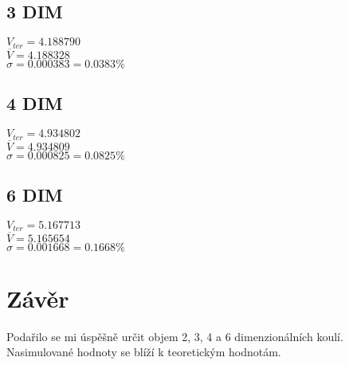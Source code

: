 \documentclass{article}
\begin{document}
\subsection{3 DIM}
$V_{ter} = 4.188790$\\
$\overline{V} = 4.188328$\\
$\sigma = 0.000383 = 0.0383 \%$
\subsection{4 DIM}
$V_{ter} = 4.934802$\\
$\overline{V} = 4.934809$\\
$\sigma = 0.000825 = 0.0825 \%$
\subsection{6 DIM}
$V_{ter} = 5.167713$\\
$\overline{V} = 5.165654$\\
$\sigma = 0.001668 = 0.1668 \%$
\newpage
\section{Závěr}
Podařilo se mi úspěšně určit objem 2, 3, 4 a 6 dimenzionálních koulí. Nasimulované hodnoty
se blíží k teoretickým hodnotám.
\end{document}
